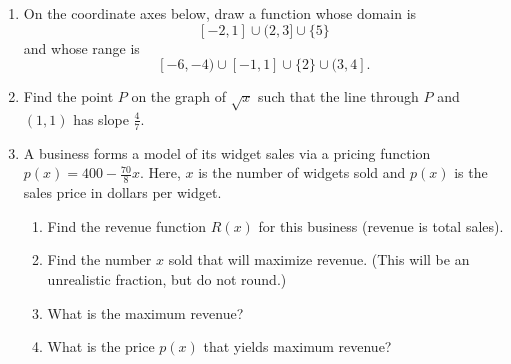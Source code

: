 \begin{enumerate}
\vfill

\item On the coordinate axes below, draw a function whose domain is
	$$[-2,1]\cup(2,3]\cup\{5\}$$
	and whose range is
	$$[-6,-4)\cup[-1,1]\cup\{2\}\cup(3,4].$$

\begin{center}
\end{center}




\newpage

\item Find the point $P$ on the graph of $\sqrt{x}$ such that the line through $P$ and $(1,1)$ has slope $\displaystyle \frac{4}{7}$.
\vfill




\item A business forms a model of its widget sales via a pricing function $p(x) = 400-\frac{70}{8}x$. Here, $x$ is the number of widgets sold and $p(x)$ is the sales price in dollars per widget.  
\begin{enumerate}
\item Find the revenue function $R(x)$ for this business (revenue is total sales). 
\item Find the number $x$ sold that will maximize revenue. (This will be an unrealistic fraction,
but do not round.)
\item What is the maximum revenue? 
\item What is the price $p(x)$ that yields maximum revenue?
\end{enumerate}


\end{enumerate}
